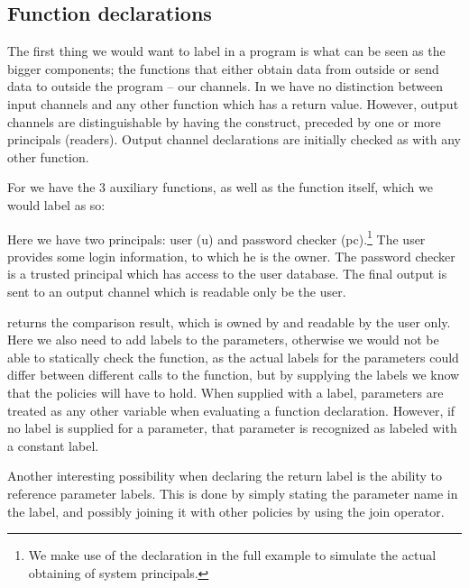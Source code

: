 

\subsection{Function declarations}
The first thing we would want to label in a program is what can be seen as the bigger components; the functions that either obtain data from outside or send data to outside the program -- our channels.
In \thelang{} we have no distinction between input channels and any other function which has a return value.
However, output channels are distinguishable by having the \dlmc{<-} construct, preceded by one or more principals (readers).
Output channel declarations are initially checked as with any other function.

For  we have the 3 auxiliary functions, as well as the  function itself, which we would label as so:\\
\begin{minipage}{\linewidth}

\end{minipage}

Here we have two principals: user (u) and password checker (pc).\footnote{We make use of the  declaration in the full example to simulate the actual obtaining of system principals.}
The user provides some login information, to which he is the owner.
The password checker is a trusted principal which has access to the user database.
The final output is sent to an output channel which is readable only be the user.

 returns the comparison result, which is owned by and readable by the user only.
Here we also need to add labels to the parameters, otherwise we would not be able to statically check the function, as the actual labels for the parameters could differ between different calls to the function, but by supplying the labels we know that the policies will have to hold.
When supplied with a label, parameters are treated as any other variable when evaluating a function declaration.
However, if no label is supplied for a parameter, that parameter is recognized as labeled with a constant label.

Another interesting possibility when declaring the return label is the ability to reference parameter labels.
This is done by simply stating the parameter name in the label, and possibly joining it with other policies by using the join operator.

